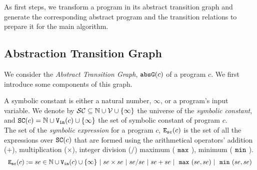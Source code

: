 As first steps, we transform a program in its abstract transition graph and generate the corresponding abstract program and the transition relations to prepare it for the main algorithm.

\subsection{Abstraction Transition Graph}
We consider the \emph{Abstract Transition Graph}, $\mathtt{abs}{\mathtt{G}}(c)$
of a program $c$.
We first introduce some components of this graph.
\begin{defn}
 \label{def:symbolic_expr}
A symbolic constant is either a natural number, $\infty$, or a program's input variable. We denote by $\mathcal{SC} \subseteq \mathbb{N} \cup \mathcal{V} \cup \{\infty \}$ the universe of the \emph{symbolic constant},
and $ \mathtt{SC}(c) = \mathbb{N} \cup {\ensuremath{\mathtt{V_{\mathtt{in}}}}}(c) \cup \{\infty \}$ the set of symbolic constant of
program $c$.\\
 The set of the \emph{symbolic expression} for a program $c$,
${\mathtt{E_{sc}}}(c)$ is the set of all the expressions over $\mathtt{SC}(c)$ that are
formed using the arithmetical operators' addition ($+$), multiplication
($\times $),  integer division ($/$) maximum ($~\mathtt{max}~ $), minimum ($~\mathtt{min}~$).
\[
  \begin{array}{rl}
  {\ensuremath{\mathtt{E_{sc}}}}(c) := se \in \mathbb{N} \cup {\ensuremath{\mathtt{V_{\mathtt{in}}}}}(c) \cup \{\infty \} ~|~ se \times se ~|~ se / se ~|~
  se + se ~|~ ~\mathtt{max}~(se, se) ~|~ ~\mathtt{min}~(se, se)
  \end{array}
\]
\end{defn}
